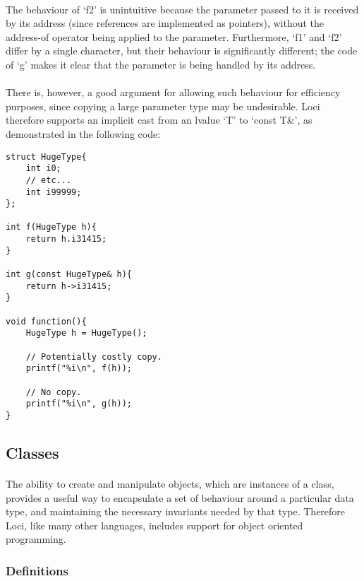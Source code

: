 \documentclass[12pt,twoside,notitlepage]{report}
\begin{document}
\paragraph{}
The behaviour of `f2' is unintuitive because the parameter passed to it is received by its address (since references are implemented as pointers), without the address-of operator being applied to the parameter. Furthermore, `f1' and `f2' differ by a single character, but their behaviour is significantly different; the code of `g' makes it clear that the parameter is being handled by its address.

\paragraph{}
There is, however, a good argument for allowing such behaviour for efficiency purposes, since copying a large parameter type may be undesirable. Loci therefore supports an implicit cast from an lvalue `T' to `const T\&', as demonstrated in the following code:

\small{
\begin{verbatim}
struct HugeType{
    int i0;
    // etc...
    int i99999;
};

int f(HugeType h){
    return h.i31415;
}

int g(const HugeType& h){
    return h->i31415;
}

void function(){
    HugeType h = HugeType();
    
    // Potentially costly copy.
    printf("%i\n", f(h));
    
    // No copy.
    printf("%i\n", g(h));
}
\end{verbatim}
}

\subsection{Classes}

\paragraph{}
The ability to create and manipulate objects, which are instances of a class, provides a useful way to encapsulate a set of behaviour around a particular data type, and maintaining the necessary invariants needed by that type. Therefore Loci, like many other languages, includes support for object oriented programming.

\subsubsection{Definitions}
\end{document}

